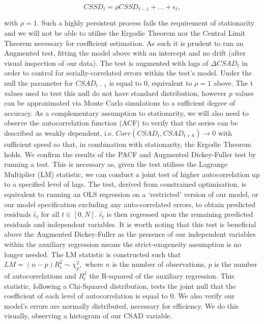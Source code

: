 \documentclass[12pt]{article}
\numberwithin{table}{section}   %
\begin{document}
$$
CSSD_t=\rho{CSSD_{t-1}}+...+\epsilon_t,
$$

with $\rho=1$. Such a highly persistent process fails the requirement of stationarity and we will not be able to utilise the Ergodic Theorem nor the Central Limit Theorem necessary for coefficient estimation. As such it is prudent to run an Augmented \citet{dfuller} test, fitting the model above with an intercept and no drift (after visual inspection of our data). The test is augmented with lags of $\Delta{CSAD_t}$ in order to control for serially-correlated errors within the test’s model. Under the null the parameter for $CSAD_{t-1}$ is equal to 0, equivalent to $\rho=1$ above. The t values used to test this null do not have standard distribution, however $p$ values can be approximated via Monte Carlo simulations \citep{mackinnon} to a sufficient degree of accuracy. As a complementary assumption to stationarity, we will also need to observe the autocorrelation function (ACF) to verify that the series can be described as weakly dependent, i.e. $Corr(CSAD_t, CSAD_{t+h})\rightarrow0$ with sufficient speed so that, in combination with stationarity, the Ergodic Theorem holds. We confirm the results of the PACF and Augmented Dickey-Fuller test by running a \citet{breusch} \citet{godfrey} test. This is necessary as, given the test utilises the Lagrange Multiplier (LM) statistic, we can conduct a joint test of higher autocorrelation up to a specified level of lags. The test, derived from constrained optimisation, is equivalent to running an OLS regression on a ‘restricted’ version of our model, or our model specification excluding any auto-correlated errors, to obtain predicted residuals $\hat{\epsilon}_t$ for all $t\in[0,N]$. $\hat{\epsilon}_t$ is then regressed upon the remaining predicted residuals and independent variables. It is worth noting that this test is beneficial above the Augmented Dickey-Fuller as the presence of our independent variables within the auxiliary regression means the strict-exogeneity assumption is no longer needed. The LM statistic is constructed such that $LM=(n-p)R^2_{\hat{\epsilon}} \sim\chi^2_p,$ where $n$ is the number of observations, $p$ is the number of autocorrelations and $R^2_{\hat{\epsilon}}$ the R-squared of the auxiliary regression. This statistic, following a Chi-Squared distribution, tests the joint null that the coefficient of each level of autocorrelation is equal to 0. We also verify our model's errors are normally distributed, necessary for efficiency. We do this visually, observing a histogram of our CSAD variable.
\end{document}
